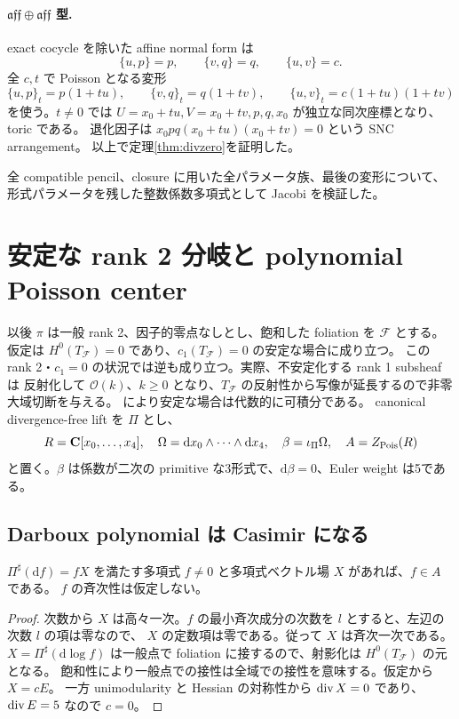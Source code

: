 \documentclass[11pt,a4paper]{ltjsarticle}
\newcommand{\OO}{\mathcal O}\newcommand{\FF}{\mathcal F}\newcommand{\cP}{\mathcal P}\newcommand{\dd}{\mathrm d}
\DeclareMathOperator{\Pois}{Pois}\DeclareMathOperator{\rank}{rank}\DeclareMathOperator{\Spec}{Spec}
\theoremstyle{remark}\newtheorem{remark}[theorem]{注意}\renewcommand{\proofname}{証明}
\begin{document}
\paragraph{$\mathfrak{aff}\oplus\mathfrak{aff}$ 型.}
exact cocycle を除いた affine normal form は
\[
 \{u,p\}=p,\qquad\{v,q\}=q,\qquad\{u,v\}=c.
\]
全 $c,t$ で Poisson となる変形
\[
 \{u,p\}_t=p(1+tu),\qquad
 \{v,q\}_t=q(1+tv),\qquad
 \{u,v\}_t=c(1+tu)(1+tv)
\]
を使う。$t\ne0$ では $U=x_0+tu,V=x_0+tv,p,q,x_0$ が独立な同次座標となり、toric である。
退化因子は $x_0pq(x_0+tu)(x_0+tv)=0$ という SNC arrangement。
以上で定理\ref{thm:divzero}を証明した。

全 compatible pencil、closure に用いた全パラメータ族、最後の変形について、
形式パラメータを残した整数係数多項式として Jacobi を検証した。

\section{安定な rank 2 分岐と polynomial Poisson center}
以後 $\pi$ は一般 rank 2、因子的零点なしとし、飽和した foliation を $\FF$ とする。
仮定は $H^0(T_\FF)=0$ であり、$c_1(T_\FF)=0$ の安定な場合に成り立つ。
この rank 2・$c_1=0$ の状況では逆も成り立つ。実際、不安定化する rank 1 subsheaf は
反射化して $\OO(k)$、$k\ge0$ となり、$T_\FF$ の反射性から写像が延長するので非零大域切断を与える。
\cite[Theorem 4.1]{CM} により安定な場合は代数的に可積分である。
canonical divergence-free lift \cite[Section 7.2]{Pym} を $\Pi$ とし、
\[
 R=\CC[x_0,\ldots,x_4],\quad
 \Omega=\dd x_0\wedge\cdots\wedge\dd x_4,\quad
 \beta=\iota_\Pi\Omega,\quad A=Z_{\Pois}(R)
\]
と置く。$\beta$ は係数が二次の primitive な3形式で、$\dd\beta=0$、Euler weight は5である。

\subsection{Darboux polynomial は Casimir になる}
\begin{lemma}
$\Pi^\sharp(\dd f)=fX$ を満たす多項式 $f\ne0$ と多項式ベクトル場 $X$ があれば、$f\in A$ である。
$f$ の斉次性は仮定しない。
\end{lemma}
\begin{proof}
次数から $X$ は高々一次。$f$ の最小斉次成分の次数を $l$ とすると、左辺の次数 $l$ の項は零なので、
$X$ の定数項は零である。従って $X$ は斉次一次である。
$X=\Pi^\sharp(\dd\log f)$ は一般点で foliation に接するので、射影化は $H^0(T_\FF)$ の元となる。
飽和性により一般点での接性は全域での接性を意味する。仮定から $X=cE$。
一方 unimodularity と Hessian の対称性から $\operatorname{div} X=0$ であり、$\operatorname{div} E=5$ なので $c=0$。
\end{proof}
\end{document}
